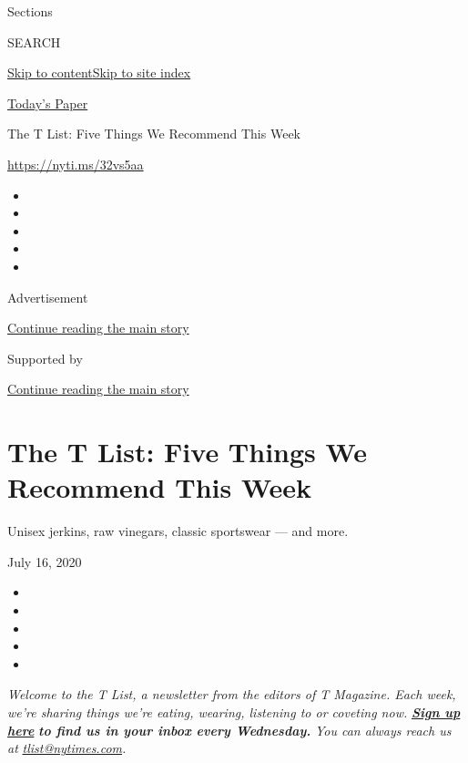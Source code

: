 Sections

SEARCH

\protect\hyperlink{site-content}{Skip to
content}\protect\hyperlink{site-index}{Skip to site index}

\href{https://myaccount.nytimes.com/auth/login?response_type=cookie\&client_id=vi}{}

\href{https://www.nytimes.com/section/todayspaper}{Today's Paper}

The T List: Five Things We Recommend This Week

\url{https://nyti.ms/32vs5aa}

\begin{itemize}
\item
\item
\item
\item
\item
\end{itemize}

Advertisement

\protect\hyperlink{after-top}{Continue reading the main story}

Supported by

\protect\hyperlink{after-sponsor}{Continue reading the main story}

\hypertarget{the-t-list-five-things-we-recommend-this-week}{%
\section{The T List: Five Things We Recommend This
Week}\label{the-t-list-five-things-we-recommend-this-week}}

Unisex jerkins, raw vinegars, classic sportswear --- and more.

July 16, 2020

\begin{itemize}
\item
\item
\item
\item
\item
\end{itemize}

\emph{Welcome to the T List, a newsletter from the editors of T
Magazine. Each week, we're sharing things we're eating, wearing,
listening to or coveting now.}
\textbf{\href{https://www.nytimes.com/newsletters/t-list?module=inline}{\emph{Sign
up here}}} \emph{\textbf{to find us in your inbox every Wednesday.}}
\emph{You can always reach us at}
\href{mailto:tlist@nytimes.com}{\emph{tlist@nytimes.com}}\emph{.}


